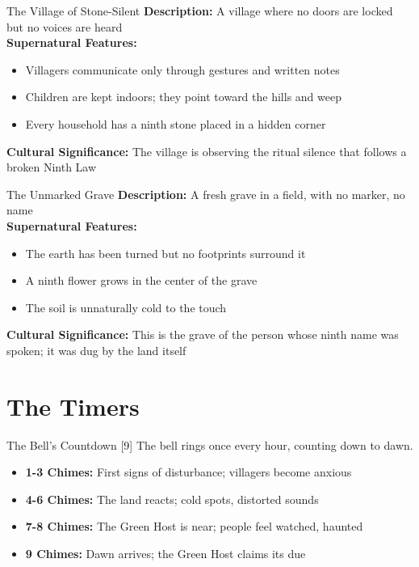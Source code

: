 \documentclass[11pt]{article}
\begin{document}
\begin{locationbox}{The Village of Stone-Silent}
    \textbf{Description:} A village where no doors are locked but no voices are heard \\
    \textbf{Supernatural Features:}
    \begin{itemize}
        \item Villagers communicate only through gestures and written notes
        \item Children are kept indoors; they point toward the hills and weep
        \item Every household has a ninth stone placed in a hidden corner
    \end{itemize}
    \textbf{Cultural Significance:} The village is observing the ritual silence that follows a broken Ninth Law
\end{locationbox}

\begin{locationbox}{The Unmarked Grave}
    \textbf{Description:} A fresh grave in a field, with no marker, no name \\
    \textbf{Supernatural Features:}
    \begin{itemize}
        \item The earth has been turned but no footprints surround it
        \item A ninth flower grows in the center of the grave
        \item The soil is unnaturally cold to the touch
    \end{itemize}
    \textbf{Cultural Significance:} This is the grave of the person whose ninth name was spoken; it was dug by the land itself
\end{locationbox}

\section*{The Timers}

\begin{mechanicsbox}{The Bell's Countdown [9]}
The bell rings once every hour, counting down to dawn.
\begin{itemize}
    \item \textbf{1-3 Chimes:} First signs of disturbance; villagers become anxious
    \item \textbf{4-6 Chimes:} The land reacts; cold spots, distorted sounds
    \item \textbf{7-8 Chimes:} The Green Host is near; people feel watched, haunted
    \item \textbf{9 Chimes:} Dawn arrives; the Green Host claims its due
\end{itemize}
\end{mechanicsbox}
\end{document}
